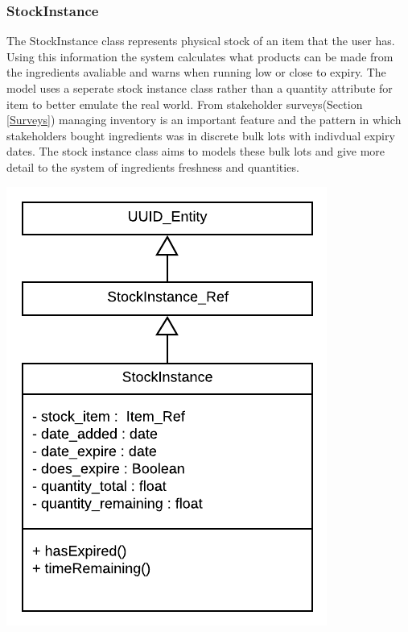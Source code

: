 \subsubsection{StockInstance}
	\begin{minipage}[t]{.6\linewidth}
		The StockInstance class represents physical stock of an item that the user has. Using this information the system calculates what products can be made from the ingredients avaliable and warns when running low or close to expiry. The model uses a seperate stock instance class rather than a quantity attribute for item to better emulate the real world. From stakeholder surveys(Section \ref{Surveys}) managing inventory is an important feature and the pattern in which stakeholders bought ingredients was in discrete bulk lots with indivdual expiry dates. The stock instance class aims to models these bulk lots and give more detail to the system of  ingredients freshness and quantities.
		
	\end{minipage}
	\hspace{0.02\linewidth}
	\begin{minipage}[t][][b]{.3\linewidth}
		\includegraphics[width=\linewidth]{images/data_model/stock.png}
	\end{minipage}

